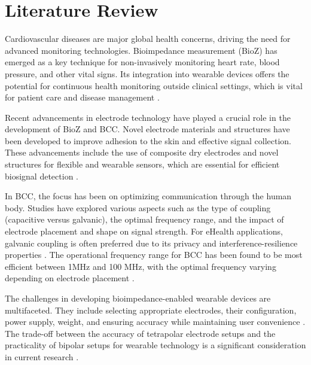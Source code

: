 \section{Literature Review}
{

Cardiovascular diseases are major global health concerns, driving the need for advanced monitoring technologies. Bioimpedance measurement (BioZ) has emerged as a key technique for non-invasively monitoring heart rate, blood pressure, and other vital signs. Its integration into wearable devices offers the potential for continuous health monitoring outside clinical settings, which is vital for patient care and disease management \cite{OriginalSource1, towards, NewSource1}.

Recent advancements in electrode technology have played a crucial role in the development of BioZ and BCC. Novel electrode materials and structures have been developed to improve adhesion to the skin and effective signal collection. These advancements include the use of composite dry electrodes and novel structures for flexible and wearable sensors, which are essential for efficient biosignal detection \cite{PubMedArticle, NewSource2}.

In BCC, the focus has been on optimizing communication through the human body. Studies have explored various aspects such as the type of coupling (capacitive versus galvanic), the optimal frequency range, and the impact of electrode placement and shape on signal strength. For eHealth applications, galvanic coupling is often preferred due to its privacy and interference-resilience properties \cite{electrode_comp, NewSource3}. The operational frequency range for BCC has been found to be most efficient between 1MHz and 100 MHz, with the optimal frequency varying depending on electrode placement \cite{electrode_comp, NewSource4}.

The challenges in developing bioimpedance-enabled wearable devices are multifaceted. They include selecting appropriate electrodes, their configuration, power supply, weight, and ensuring accuracy while maintaining user convenience \cite{OriginalSource1, towards, NewSource5}. The trade-off between the accuracy of tetrapolar electrode setups and the practicality of bipolar setups for wearable technology is a significant consideration in current research \cite{towards, NewSource6}.

}
